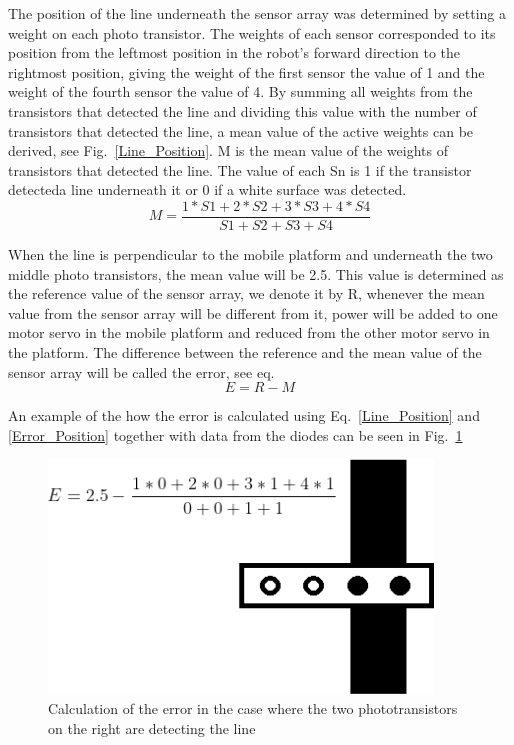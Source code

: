The position of the line underneath the sensor array was determined by setting a weight on each photo transistor. The weights of each sensor corresponded to its position from the leftmost position in the robot's forward direction to the rightmost position, giving the weight of the first sensor the value of 1 and the weight of the fourth sensor the value of 4. By summing all weights from the transistors that detected the line and dividing this value with the number of transistors that detected the line, a mean value of the active weights can be derived, see Fig.~\ref{Line_Position}. M is the mean value of the weights of transistors that detected the line. The value of each Sn is 1 if the transistor detecteda line underneath it or 0 if a white surface was detected.
\begin{equation}
    M=\frac{1*S1+2*S2+3*S3+4*S4}{S1+S2+S3+S4}
    \label{Line_Position}
\end{equation}

When the line is perpendicular to the mobile platform and underneath the two middle photo transistors, the mean value will be 2.5. This value is determined as the reference value of the sensor array, we denote it by R, whenever the mean value from the sensor array will be different from it, power will be added to one motor servo in the mobile platform and reduced from the other motor servo in the platform. The difference between the reference and the mean value of the sensor array will be called the error, see eq.
\begin{equation}
    E=R-M
    \label{Error_Position}
\end{equation}

An example of the how the error is calculated using Eq.~\eqref{Line_Position} and \eqref{Error_Position} together with data from the diodes can be seen in Fig.~\ref{Line_Error_ex}

\begin{figure}[h]
    \centering
    \includegraphics[width =\linewidth]{sections/assets/Line_Error_ex.PNG}
    \caption{Calculation of the error in the case where the two phototransistors on the right are detecting the line}
    \label{Line_Error_ex}
\end{figure}


